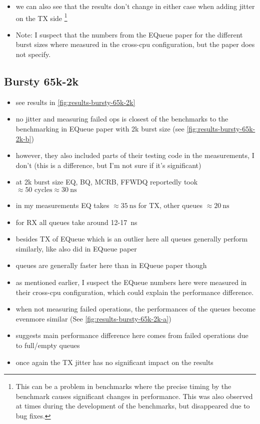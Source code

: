 \begin{itemize}
    \item we can also see that the results don't change in either case when adding jitter on the TX side
        \footnote{This can be a problem in benchmarks where the precise timing by the benchmark causes
            significant changes in performance. This was also observed at times during the development of the
            benchmarks, but disappeared due to bug fixes. }
    \item Note: I suspect that the numbers from the EQueue paper for the different burst sizes where measured
        in the cross-cpu configuration, but the paper does not specify.
\end{itemize}

\subsection{Bursty 65k-2k}
\begin{itemize}
    \item see results in \autoref{fig:results-bursty-65k-2k}
    \item no jitter and measuring failed ops is closest of the benchmarks to the benchmarking in EQueue paper
        with 2k burst size (see \autoref{fig:results-bursty-65k-2k-b})
    \item however, they also included parts of their testing code in the measurements, I don't (this is a
        difference, but I'm not sure if it's significant)
    \item at 2k burst size EQ, BQ, MCRB, FFWDQ reportedly took $\approx 50\text{ cycles} \approx \SI{30}{\nano\second}$
    \item in my measurements EQ takes $\approx \SI{35}{\nano\second}$ for TX, other queues $\approx
        \SI{20}{\nano\second}$
    \item for RX all queues take around 12-\SI{17}{\nano\second}
    \item besides TX of EQueue which is an outlier here all queues generally perform similarly, like also did
        in EQueue paper
    \item queues are generally faster here than in EQueue paper though
    \item as mentioned earlier, I suspect the EQueue numbers here were measured in their cross-cpu
        configuration, which could explain the performance difference.
    \item when not measuring failed operations, the performances of the queues become evenmore similar (See
        \autoref{fig:results-bursty-65k-2k-a})
    \item suggests main performance difference here comes from failed operations due to full/empty queues
    \item once again the TX jitter has no significant impact on the results
\end{itemize}

